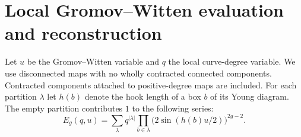 \section{Local Gromov--Witten evaluation and reconstruction}\label{sec:evaluation}

Let $u$ be the Gromov--Witten variable and $q$ the local curve-degree
variable. We use disconnected maps with no wholly contracted
connected components. Contracted components attached to positive-degree
maps are included. For each partition $\lambda$ let $h(b)$ denote the
hook length of a box $b$ of its Young diagram. The empty partition
contributes $1$ to the following series:
\begin{equation}\label{eq:hook}
 E_g(q,u)=\sum_{\lambda} q^{|\lambda|}
       \prod_{b\in\lambda}\bigl(2\sin(h(b)u/2)\bigr)^{2g-2}.
\end{equation}

